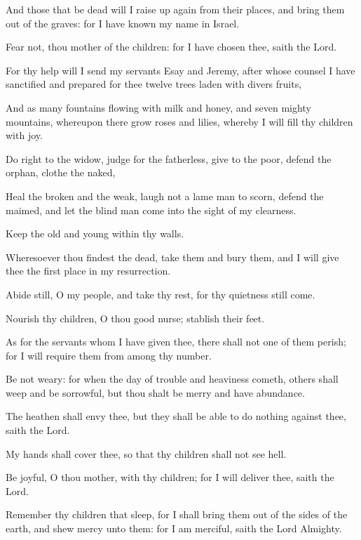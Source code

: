 {\par }{\PP {}And those that be dead will I raise up again from their places, and bring them out of the graves: for I have known my name in Israel.
\par }{\PP {}Fear not, thou mother of the children: for I have chosen thee, saith the Lord.
\par }{\PP {}For thy help will I send my servants Esay and Jeremy, after whose counsel I have sanctified and prepared for thee twelve trees laden with divers fruits,
\par }{\PP {}And as many fountains flowing with milk and honey, and seven mighty mountains, whereupon there grow roses and lilies, whereby I will fill thy children with joy.
\par }{\PP {}Do right to the widow, judge for the fatherless, give to the poor, defend the orphan, clothe the naked,
\par }{\PP {}Heal the broken and the weak, laugh not a lame man to scorn, defend the maimed, and let the blind man come into the sight of my clearness.
\par }{\PP {}Keep the old and young within thy walls.
\par }{\PP {}Wheresoever thou findest the dead, take them and bury them, and I will give thee the first place in my resurrection.
\par }{\PP {}Abide still, O my people, and take thy rest, for thy quietness still come.
\par }{\PP {}Nourish thy children, O thou good nurse; stablish their feet.
\par }{\PP {}As for the servants whom I have given thee, there shall not one of them perish; for I will require them from among thy number.
\par }{\PP {}Be not weary: for when the day of trouble and heaviness cometh, others shall weep and be sorrowful, but thou shalt be merry and have abundance.
\par }{\PP {}The heathen shall envy thee, but they shall be able to do nothing against thee, saith the Lord.
\par }{\PP {}My hands shall cover thee, so that thy children shall not see hell.
\par }{\PP {}Be joyful, O thou mother, with thy children; for I will deliver thee, saith the Lord.
\par }{\PP {}Remember thy children that sleep, for I shall bring them out of the sides of the earth, and shew mercy unto them: for I am merciful, saith the Lord Almighty.
}
